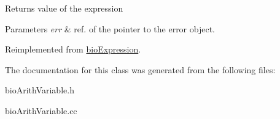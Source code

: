 \begin{DoxyReturn}{Returns}
value of the expression 
\end{DoxyReturn}

\begin{DoxyParams}{Parameters}
{\em err} & ref. of the pointer to the error object. \\
\hline
\end{DoxyParams}


Reimplemented from \hyperlink{classbio_expression_af58662a5d4d456f15bc4f2c9bd4f8a5b}{bio\+Expression}.



The documentation for this class was generated from the following files\+:\begin{DoxyCompactItemize}
\item 
bio\+Arith\+Variable.\+h\item 
bio\+Arith\+Variable.\+cc\end{DoxyCompactItemize}
